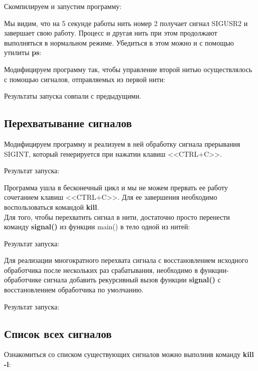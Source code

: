 \documentclass[a4paper]{article}
\begin{document}
	Скомпилируем и запустим программу:	
	
	
	Мы видим, что на 5 секунде работы нить номер 2 получает сигнал SIGUSR2 и завершает свою работу. Процесс и другая нить при этом продолжают выполняться в нормальном режиме. Убедиться в этом можно и с помощью утилиты \textbf{ps}:
	
	
	Модифицируем программу так, чтобы управление второй нитью осуществлялось с помощью сигналов, отправляемых из первой нити:
	

	
	Результаты запуска совпали с предыдущими.

	\subsection{Перехватывание сигналов}
	Модифицируем программу и реализуем в ней обработку сигнала прерывания SIGINT, который генерируется при нажатии клавиш <<CTRL+C>>.
	

	
	Результат запуска:
	
	
	Программа ушла в бесконечный цикл и мы не можем прервать ее работу сочетанием клавиш <<CTRL+C>>. Для ее завершения необходимо воспользоваться командой \textbf{kill}.\\

	Для того, чтобы перехватить сигнал в нити, достаточно просто перенести команду \textbf{signal()} из функции main() в тело одной из нитей:
	
	

	Результат запуска:
	
	
	Для реализации многократного перехвата сигнала с восстановлением исходного обработчика после нескольких раз срабатывания, необходимо в функции-обработчике сигнала добавить рекурсивный вызов функции \textbf{signal()} с восстановлением обработчика по умолчанию.
	
	
	Результат запуска:
	
	
	\subsection{Список всех сигналов}
	Ознакомиться со списком существующих сигналов можно выполнив команду \textbf{kill -l}:
	
	
\end{document}
